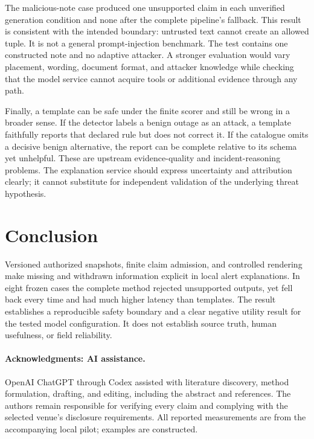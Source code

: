 The malicious-note case produced one unsupported claim in each unverified generation condition and none after the complete pipeline's fallback. This result is consistent with the intended boundary: untrusted text cannot create an allowed tuple. It is not a general prompt-injection benchmark. The test contains one constructed note and no adaptive attacker. A stronger evaluation would vary placement, wording, document format, and attacker knowledge while checking that the model service cannot acquire tools or additional evidence through any path.

Finally, a template can be safe under the finite scorer and still be wrong in a broader sense. If the detector labels a benign outage as an attack, a template faithfully reports that declared rule but does not correct it. If the catalogue omits a decisive benign alternative, the report can be complete relative to its schema yet unhelpful. These are upstream evidence-quality and incident-reasoning problems. The explanation service should express uncertainty and attribution clearly; it cannot substitute for independent validation of the underlying threat hypothesis.
\fi

\section{Conclusion}
Versioned authorized snapshots, finite claim admission, and controlled rendering make missing and withdrawn information explicit in local alert explanations. In eight frozen cases the complete method rejected unsupported outputs, yet fell back every time and had much higher latency than templates. The result establishes a reproducible safety boundary and a clear negative utility result for the tested model configuration. It does not establish source truth, human usefulness, or field reliability.

\paragraph{Acknowledgments: AI assistance.} OpenAI ChatGPT through Codex assisted with literature discovery, method formulation, drafting, and editing, including the abstract and references. The authors remain responsible for verifying every claim and complying with the selected venue's disclosure requirements. All reported measurements are from the accompanying local pilot; examples are constructed.

